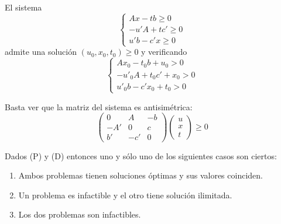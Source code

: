\documentclass[PM.tex]{subfiles}
\begin{document}
\begin{lema}
El sistema
\begin{equation*}\label{sistema1}\begin{cases}
	Ax - tb ≥ 0\\
	-u'A + tc' ≥ 0\\
	u'b - c'x ≥ 0
\end{cases}\end{equation*}
admite una solución $(u_0,x_0,t_0) ≥ 0$ y verificando
\begin{equation*}\label{sistema2}\begin{cases}
	Ax_0 - t_0b +u_0     > 0\\
	-u'_0A + t_0c' + x_0  > 0\\
	u'_0b - c'x_0 + t_0 > 0
\end{cases}\end{equation*}
\end{lema}

\begin{dem}
Basta ver que la matriz del sistema es antisimétrica:
\[ \begin{pmatrix}
	0  &  A  & -b\\
	-A' &  0  & c\\
	b'& -c'  & 0 
\end{pmatrix}\begin{pmatrix}
	u\\x\\t
\end{pmatrix} ≥ 0 \]
\end{dem}

\begin{theorem}
Dados (P) y (D) entonces uno y sólo uno de los siguientes casos son ciertos:
\begin{enumerate}
	\item Ambos problemas tienen soluciones óptimas y sus valores coinciden.
	\item Un problema es infactible y el otro tiene solución ilimitada.
	\item Los dos problemas son infactibles.
\end{enumerate}
\end{theorem}
\end{document}
